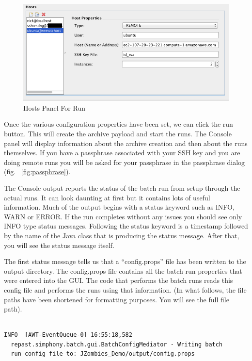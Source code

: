 \documentclass[11pt]{amsart}
\begin{document}
\begin{figure}[h]
\begin{center}
\vspace{.2in}
\centerline {
\includegraphics[width=6in]{images/hosts_panel_run.png}
}
\caption{Hosts Panel For Run}
\label{fig:hosts_panel_run}
\end{center}
\end{figure}


Once the various configuration properties have been set, we can click the run button. This will create the archive payload and start the runs. The Console panel will display information about the archive creation and then about the runs themselves. If you have a passphrase associated with your SSH key and you are doing remote runs you will be asked for  your passphrase in the passphrase dialog (fig. ~\ref{fig:passphrase}). 

The Console output reports the status of the batch run from setup through the actual runs. It can look daunting at first but it contains lots of useful information. Much of the output begins with a status keyword such as INFO, WARN or ERROR. If the run completes without any issues you should see only INFO type status messages. Following the status keyword is a timestamp followed by the name of the Java class that is producing the status message. After that, you will see the status message itself.

The first status message tells us that a ``config.props'' file has been written to the output directory. The config.props file
contains all the batch run properties that were entered into the GUI. The code that performs the batch runs reads this config file and performs the runs using that information. (In what follows, the file paths have been shortened for formatting purposes.  You will see the full file path).

\begin{verbatim}

INFO  [AWT-EventQueue-0] 16:55:18,582 
  repast.simphony.batch.gui.BatchConfigMediator - Writing batch 
  run config file to: JZombies_Demo/output/config.props
\end{verbatim}
\end{document}

